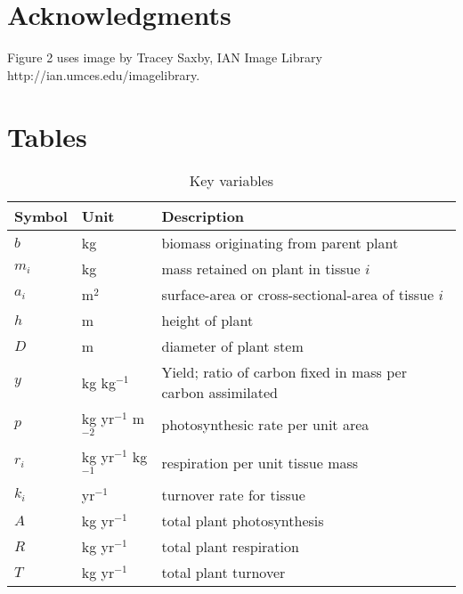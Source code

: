 \documentclass[12pt, a4paper]{article}
\begin{document}
\section{Acknowledgments}

Figure 2 uses image by Tracey Saxby, IAN Image Library http://ian.umces.edu/imagelibrary.

\newpage



\newpage

\section{Tables}\label{tables}

\begin{table}[ht]
 \caption{Key variables
}
\centering

{\footnotesize  %
 \begin{doublespace}
  \begin{tabular}{p{2cm}p{2cm}p{7cm}}
  \hline
  Symbol & Unit & Description \\
  \hline

  $b$   & kg  & biomass originating from parent plant\\
  $m_i$ & kg  & mass retained on plant in tissue $i$\\
  $a_i$ & m$^2$  & surface-area or cross-sectional-area of tissue $i$\\
  $h$   & m  & height of plant\\
  $D$   & m  & diameter of plant stem\\

  $y$ & kg kg$^{-1}$ & Yield; ratio of carbon fixed in mass per carbon assimilated \\
  $p$ & kg yr$^{-1}$ m$^{-2}$  & photosynthesic rate per unit area \\
  $r_i$ & kg yr$^{-1}$ kg$^{-1}$  & respiration per unit tissue mass \\
  $k_i$ & yr$^{-1}$ & turnover rate for tissue \\
  $A$ & kg yr$^{-1}$ & total plant photosynthesis \\
  $R$ & kg yr$^{-1}$ & total plant respiration \\
  $T$ & kg yr$^{-1}$ & total plant turnover \\
  \hline
  \end{tabular}
\end{doublespace}}
\label{tab:definitions}
\end{table}
\end{document}
